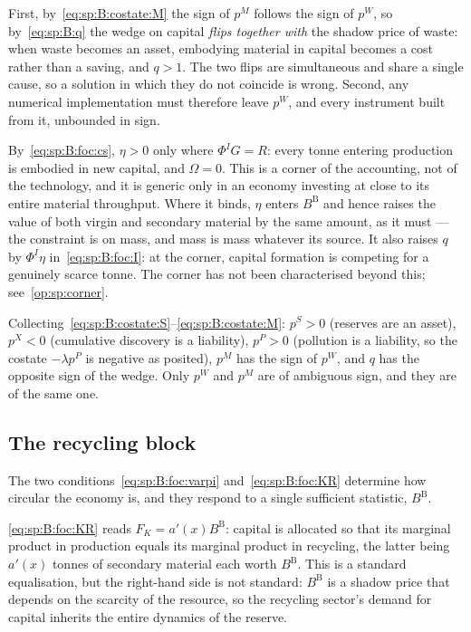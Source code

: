 First, by~\eqref{eq:sp:B:costate:M} the sign of $p^M$ follows the sign of $p^W$, so
by~\eqref{eq:sp:B:q} the wedge on capital \emph{flips together with} the shadow price of waste: when
waste becomes an asset, embodying material in capital becomes a cost rather than a saving, and $q>1$.
The two flips are simultaneous and share a single cause, so a solution in which they do not coincide is
wrong. Second, any numerical implementation must therefore leave $p^W$, and every instrument built from
it, unbounded in sign.

 By~\eqref{eq:sp:B:foc:cs}, $\eta>0$ only where $\Phi^IG=R$: every
tonne entering production is embodied in new capital, and $\Omega=0$. This is a corner of the
accounting, not of the technology, and it is generic only in an economy investing at close to its entire
material throughput. Where it binds, $\eta$ enters $B^{\mathrm B}$ and hence raises the value of both virgin and
secondary material by the same amount, as it must --- the constraint is on mass, and mass is mass
whatever its source. It also raises $q$ by $\Phi^I\eta$ in~\eqref{eq:sp:B:foc:I}: at the corner, capital
formation is competing for a genuinely scarce tonne. The corner has not been characterised beyond this;
see~\ref{op:sp:corner}.

 Collecting~\eqref{eq:sp:B:costate:S}--\eqref{eq:sp:B:costate:M}:
$p^S>0$ (reserves are an asset), $p^X<0$ (cumulative discovery is a liability), $p^P>0$ (pollution is a
liability, so the costate $-\lambda p^P$ is negative as posited), $p^M$ has the sign of $p^W$, and $q$
has the opposite sign of the wedge. Only $p^W$ and $p^M$ are of ambiguous sign, and they are of the same
one.


\subsection{The recycling block}\label{sec:sp:B:recycling}

The two conditions~\eqref{eq:sp:B:foc:varpi} and~\eqref{eq:sp:B:foc:KR} determine how circular the
economy is, and they respond to a single sufficient statistic, $B^{\mathrm B}$.

 \eqref{eq:sp:B:foc:KR} reads $F_K=a'(x)B^{\mathrm B}$: capital is allocated so that
its marginal product in production equals its marginal product in recycling, the latter being $a'(x)$
tonnes of secondary material each worth $B^{\mathrm B}$. This is a standard equalisation, but the right-hand side is
not standard: $B^{\mathrm B}$ is a shadow price that depends on the scarcity of the resource, so the recycling
sector's demand for capital inherits the entire dynamics of the reserve.

